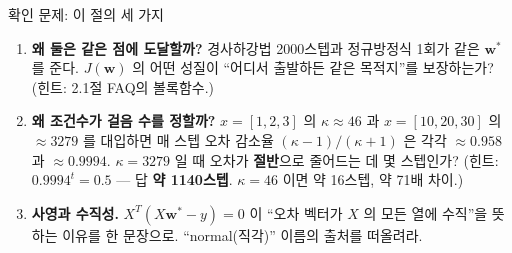 \begin{frame}{확인 문제: 이 절의 세 가지}
  \begin{enumerate}
    \item \textbf{왜 둘은 같은 점에 도달할까?}
      경사하강법 2000스텝과 정규방정식 1회가 같은 $\boldsymbol{w}^{*}$ 를 준다.
      $J(\boldsymbol{w})$ 의 어떤 성질이 ``어디서 출발하든 같은 목적지''를
      보장하는가? (힌트: 2.1절 FAQ의 볼록함수.)
    \item \textbf{왜 조건수가 걸음 수를 정할까?}
      $x=[1,2,3]$ 의 $\kappa \approx 46$ 과 $x=[10,20,30]$ 의
      $\approx 3279$ 를 대입하면 매 스텝 오차 감소율
      $(\kappa-1)/(\kappa+1)$ 은 각각 $\approx 0.958$ 과
      $\approx 0.9994$. $\kappa = 3279$ 일 때 오차가 \textbf{절반}으로
      줄어드는 데 몇 스텝인가? (힌트: $0.9994^t = 0.5$ ---
      답 \textbf{약 1140스텝}. $\kappa = 46$ 이면 약 16스텝,
      약 71배 차이.)
    \item \textbf{사영과 수직성.}
      $X^T(X\boldsymbol{w}^{*} - y) = 0$ 이 ``오차 벡터가 $X$ 의 모든 열에
      수직''을 뜻하는 이유를 한 문장으로. ``normal(직각)'' 이름의
      출처를 떠올려라.
  \end{enumerate}
\end{frame}
